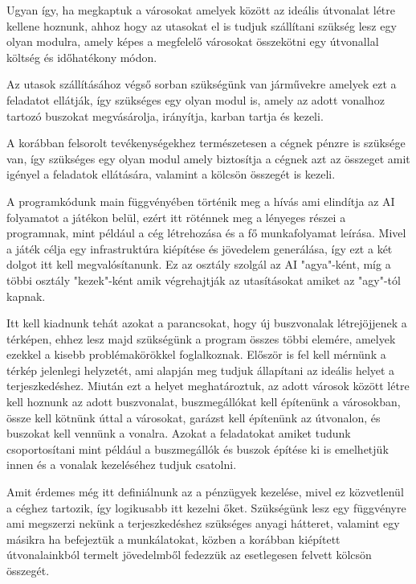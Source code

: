 Ugyan így, ha megkaptuk a városokat amelyek között az ideális útvonalat létre kellene hoznunk, ahhoz hogy az utasokat el is tudjuk szállítani szükség lesz egy olyan modulra, amely képes a megfelelő városokat összekötni egy útvonallal költség és időhatékony módon.

Az utasok szállításához végső sorban szükségünk van járművekre amelyek ezt a feladatot ellátják, így szükséges egy olyan modul is, amely az adott vonalhoz tartozó buszokat megvásárolja, irányítja, karban tartja és kezeli.

A korábban felsorolt tevékenységekhez természetesen a cégnek pénzre is szüksége van, így szükséges egy olyan modul amely biztosítja a cégnek azt az összeget amit igényel a feladatok ellátására, valamint a kölcsön összegét is kezeli.



A programkódunk main függvényében történik meg a hívás ami elindítja az AI folyamatot a játékon belül, ezért itt röténnek meg a lényeges  részei a programnak, mint például a cég létrehozása és a fő munkafolyamat leírása. Mivel a játék célja egy infrastruktúra kiépítése és jövedelem generálása, így ezt a két dolgot itt kell megvalósítanunk. Ez az osztály szolgál az AI "agya"-ként, míg a többi osztály "kezek"-ként amik végrehajtják az utasításokat amiket az "agy"-tól kapnak.

Itt kell kiadnunk tehát azokat a parancsokat, hogy új buszvonalak létrejöjjenek a térképen, ehhez lesz majd szükségünk a program összes többi elemére, amelyek ezekkel a kisebb problémakörökkel foglalkoznak. Először is fel kell mérnünk a térkép jelenlegi helyzetét, ami alapján meg tudjuk állapítani az ideális helyet a terjeszkedéshez. Miután ezt a helyet meghatároztuk, az adott városok között létre kell hoznunk az adott buszvonalat, buszmegállókat kell építenünk a városokban, össze kell kötnünk úttal a városokat, garázst kell építenünk az útvonalon, és buszokat kell vennünk a vonalra. Azokat a feladatokat amiket tudunk csoportosítani mint például a buszmegállók és buszok építése ki is emelhetjük innen és a vonalak kezeléséhez tudjuk csatolni.

Amit érdemes még itt definiálnunk az a pénzügyek kezelése, mivel ez közvetlenül a céghez tartozik, így logikusabb itt kezelni őket. Szükségünk lesz egy függvényre ami megszerzi nekünk a terjeszkedéshez szükséges anyagi hátteret, valamint egy másikra ha befejeztük a munkálatokat, közben a korábban kiépített útvonalainkból termelt jövedelmből fedezzük az esetlegesen felvett kölcsön összegét.


